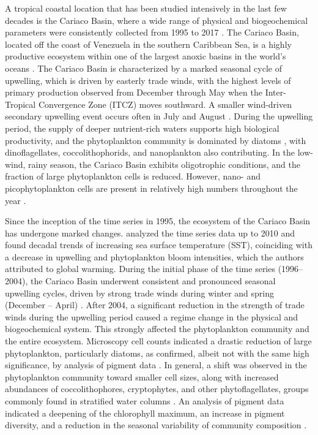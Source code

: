 \documentclass[draft]{agujournal2019}
\begin{document}
A tropical coastal location that has been studied intensively in the last few decades is the Cariaco Basin, where a wide range of physical and biogeochemical parameters were consistently collected from 1995 to 2017 \cite{muller-karger_scientific_2019}. The Cariaco Basin, located off the coast of Venezuela in the southern Caribbean Sea, is a highly productive ecosystem within one of the largest anoxic basins in the world's oceans \cite{edgcomb_accessing_2011}. The Cariaco Basin is characterized by a marked seasonal cycle of upwelling, which is driven by easterly trade winds, with the highest levels of primary production observed from December through May when the Inter-Tropical Convergence Zone (ITCZ) moves southward. A smaller wind-driven secondary upwelling event occurs often in July and August \cite{mullerkarger_annual_2001, astor_seasonal_2003}. During the upwelling period, the supply of deeper nutrient-rich waters supports high biological productivity, and the phytoplankton community is dominated by diatoms \cite{romero_seasonal_2009}, with dinoflagellates, coccolithophorids, and nanoplankton also contributing. In the low-wind, rainy season, the Cariaco Basin exhibits oligotrophic conditions, and the fraction of large phytoplankton cells is reduced. However, nano- and picophytoplankton cells are present in relatively high numbers throughout the year \cite{lorenzoni_characterization_2015}.    

Since the inception of the time series in 1995, the ecosystem of the Cariaco Basin has undergone marked changes.  analyzed the time series data up to 2010 and found decadal trends of increasing sea surface temperature (SST), coinciding with a decrease in upwelling and phytoplankton bloom intensities, which the authors attributed to global warming. During the initial phase of the time series (1996–2004), the Cariaco Basin underwent consistent and pronounced seasonal upwelling cycles, driven by strong trade winds during winter and spring (December – April) \cite{mullerkarger_annual_2001, astor_seasonal_2003}. After 2004, a significant reduction in the strength of trade winds during the upwelling period \cite{taylor_ecosystem_2012} caused a regime change in the physical and biogeochemical system. This strongly affected the phytoplankton community and the entire ecosystem. Microscopy cell counts indicated a drastic reduction of large phytoplankton, particularly diatoms, as confirmed, albeit not with the same high significance, by analysis of pigment data \cite{pinckney_phytoplankton_2015}. In general, a shift was observed in the phytoplankton community toward smaller cell sizes, along with increased abundances of coccolithophores, cryptophytes, and other phytoflagellates, groups commonly found in stratified water columns \cite{lorenzoni_characterization_2015}. An analysis of pigment data indicated a deepening of the chlorophyll maximum, an increase in pigment diversity, and a reduction in the seasonal variability of community composition \cite{pinckney_phytoplankton_2015}. 
\end{document}
